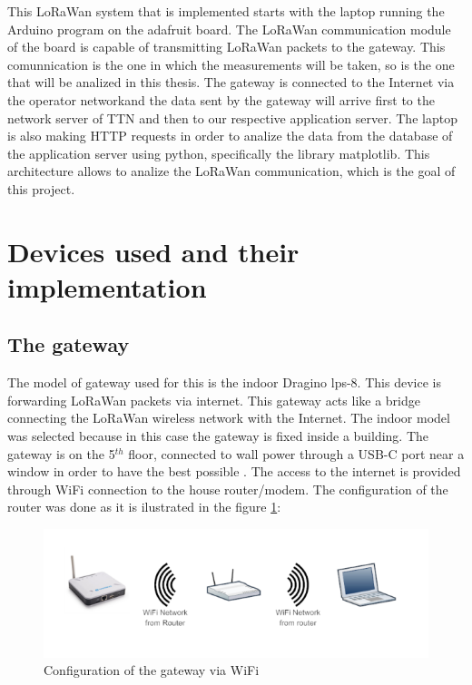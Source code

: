 This LoRaWan system that is implemented starts with the laptop running the Arduino 
program on the adafruit board. The LoRaWan communication module of the board
is capable of transmitting LoRaWan packets to the gateway. This comunnication is the one 
in which the measurements will be taken, so is the one that will be analized in this thesis. 
The gateway is connected to the Internet via the operator networkand the data sent by the gateway 
will arrive first to the network server of TTN and then to our respective application server. 
The laptop is also making HTTP requests in order to analize the data from the database of the 
application server using python, specifically the library matplotlib. This architecture allows 
to analize the LoRaWan communication, which is the goal of this project.

\section{Devices used and their implementation}

\subsection{The gateway} 
\label{sec:s-gate}
The model of gateway used for this is the indoor Dragino lps-8. This device is forwarding LoRaWan 
packets via internet. This gateway acts like a bridge connecting the LoRaWan wireless network 
with the Internet. The indoor model was selected because in this case the gateway is fixed inside 
a building.
The gateway is on the 5$^{th}$ floor, connected to wall 
power through a USB-C port near a window in order to have the best possible . The access to the internet is 
provided through WiFi connection to the house router/modem. The configuration of the router was done 
as it is ilustrated in the figure \ref{chap:third:fig:gwconf}:

\begin{figure}[htbp]
    \includegraphics[width=\linewidth]{GatewayConfig.png}
    \caption{Configuration of the gateway via WiFi}
    \label{chap:third:fig:gwconf}
\end{figure}

